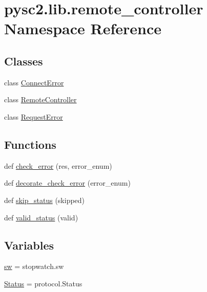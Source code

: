 \hypertarget{namespacepysc2_1_1lib_1_1remote__controller}{}\section{pysc2.\+lib.\+remote\+\_\+controller Namespace Reference}
\label{namespacepysc2_1_1lib_1_1remote__controller}
\subsection*{Classes}
\begin{DoxyCompactItemize}
\item 
class \mbox{\hyperlink{classpysc2_1_1lib_1_1remote__controller_1_1_connect_error}{Connect\+Error}}
\item 
class \mbox{\hyperlink{classpysc2_1_1lib_1_1remote__controller_1_1_remote_controller}{Remote\+Controller}}
\item 
class \mbox{\hyperlink{classpysc2_1_1lib_1_1remote__controller_1_1_request_error}{Request\+Error}}
\end{DoxyCompactItemize}
\subsection*{Functions}
\begin{DoxyCompactItemize}
\item 
def \mbox{\hyperlink{namespacepysc2_1_1lib_1_1remote__controller_a834075572df5617084fb9618de135fc3}{check\+\_\+error}} (res, error\+\_\+enum)
\item 
def \mbox{\hyperlink{namespacepysc2_1_1lib_1_1remote__controller_a469c0be9c668884747bc6317be726499}{decorate\+\_\+check\+\_\+error}} (error\+\_\+enum)
\item 
def \mbox{\hyperlink{namespacepysc2_1_1lib_1_1remote__controller_a52dd1ac8e959e3c832344293a330a92a}{skip\+\_\+status}} (skipped)
\item 
def \mbox{\hyperlink{namespacepysc2_1_1lib_1_1remote__controller_a8c5dd194ab269c652caa84cb3cf55188}{valid\+\_\+status}} (valid)
\end{DoxyCompactItemize}
\subsection*{Variables}
\begin{DoxyCompactItemize}
\item 
\mbox{\hyperlink{namespacepysc2_1_1lib_1_1remote__controller_a89070c143c0a826424cc4e556f2c86ec}{sw}} = stopwatch.\+sw
\item 
\mbox{\hyperlink{namespacepysc2_1_1lib_1_1remote__controller_a5617a762b1212f364946016f69def53f}{Status}} = protocol.\+Status
\end{DoxyCompactItemize}


